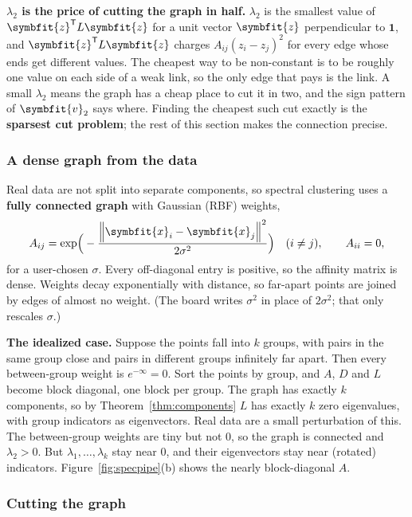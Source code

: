 \documentclass[11pt]{article}
\newcommand{\bm}[1]{\symbfit{#1}}
\newcommand{\vx}{\bm{x}}
\newcommand{\vz}{\bm{z}}
\newcommand{\one}{\symbf{1}}
\newcommand{\T}{^{\mathsf T}}
\newcommand{\norm}[1]{\left\lVert #1\right\rVert}
\begin{document}
\begin{intuition}
\textbf{$\lambda_2$ is the price of cutting the graph in half.} $\lambda_2$ is the smallest value of $\vz\T L\vz$ for a unit vector $\vz$ perpendicular to $\one$, and $\vz\T L\vz$ charges $A_{ij}(z_i-z_j)^2$ for every edge whose ends get different values. The cheapest way to be non-constant is to be roughly one value on each side of a weak link, so the only edge that pays is the link. A small $\lambda_2$ means the graph has a cheap place to cut it in two, and the sign pattern of $\bm v_2$ says where. Finding the cheapest such cut exactly is the \textbf{sparsest cut problem}; the rest of this section makes the connection precise.
\end{intuition}

\subsubsection*{A dense graph from the data}

Real data are not split into separate components, so spectral clustering uses a \textbf{fully connected graph} with Gaussian (RBF) weights,
\[
A_{ij}=\exp\!\Big(-\frac{\norm{\vx_i-\vx_j}^2}{2\sigma^2}\Big)\quad(i\ne j),\qquad A_{ii}=0,
\]
for a user-chosen $\sigma$. Every off-diagonal entry is positive, so the affinity matrix is dense. Weights decay exponentially with distance, so far-apart points are joined by edges of almost no weight. (The board writes $\sigma^2$ in place of $2\sigma^2$; that only rescales $\sigma$.)

\begin{intuition}
\textbf{The idealized case.} Suppose the points fall into $k$ groups, with pairs in the same group close and pairs in different groups infinitely far apart. Then every between-group weight is $e^{-\infty}=0$. Sort the points by group, and $A$, $D$ and $L$ become block diagonal, one block per group. The graph has exactly $k$ components, so by Theorem~\ref{thm:components} $L$ has exactly $k$ zero eigenvalues, with group indicators as eigenvectors. Real data are a small perturbation of this. The between-group weights are tiny but not $0$, so the graph is connected and $\lambda_2>0$. But $\lambda_1,\dots,\lambda_k$ stay near $0$, and their eigenvectors stay near (rotated) indicators. Figure~\ref{fig:specpipe}(b) shows the nearly block-diagonal $A$.
\end{intuition}

\subsubsection*{Cutting the graph}
\end{document}
